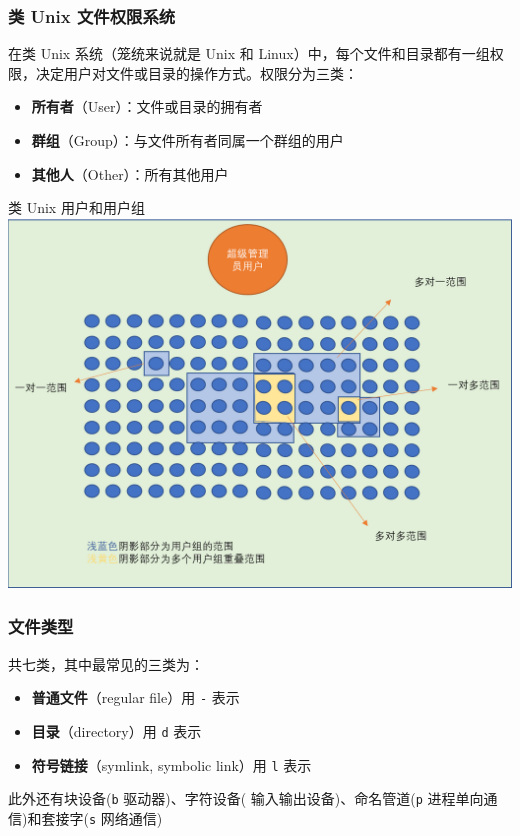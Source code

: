 \documentclass[UTF8, 16pt]{beamer}
\begin{document}
\begin{frame}
    \frametitle{类 Unix 文件权限系统}
    
    在类 Unix 系统（笼统来说就是 Unix 和 Linux）中，每个文件和目录都有一组权限，决定用户对文件或目录的操作方式。权限分为三类：
    \begin{itemize}
        \item \textbf{所有者}（User）：文件或目录的拥有者
        \item \textbf{群组}（Group）：与文件所有者同属一个群组的用户
        \item \textbf{其他人}（Other）：所有其他用户
    \end{itemize}
\end{frame}

\begin{frame}
    \centering
    \textcolor{sufered}{类 Unix 用户和用户组}
    \includegraphics[width=0.95\linewidth]{shell/user.png}
\end{frame}

\begin{frame}
    \frametitle{文件类型}
    \textcolor{sufered}{共七类，其中最常见的三类为：}
    
    \begin{itemize}
        \item \textbf{普通文件}（regular file）用 \texttt{-} 表示
        \item \textbf{目录}（directory）用 \texttt{d} 表示
        \item \textbf{符号链接}（symlink, symbolic link）用 \texttt{l} 表示
    \end{itemize}
    
    此外还有块设备(\texttt{b} 驱动器)、字符设备( 输入输出设备)、命名管道(\texttt{p} 进程单向通信)和套接字(\texttt{s} 网络通信)
\end{frame}
\end{document}

